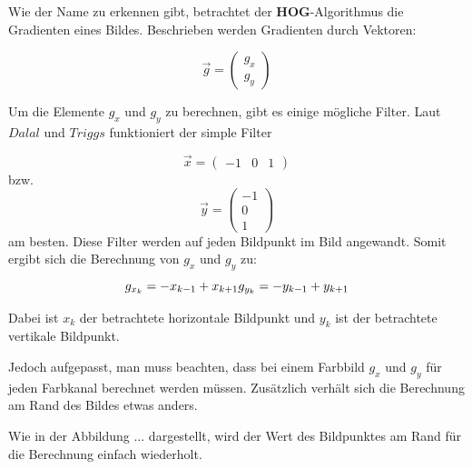 Wie der Name zu erkennen gibt, betrachtet der \textbf{HOG}-Algorithmus die Gradienten eines Bildes. Beschrieben werden Gradienten durch Vektoren:

$$
\vec{g}=\begin{pmatrix}
	g_x \\
	g_y
\end{pmatrix}
$$

Um die Elemente $g_x$ und $g_y$ zu berechnen, gibt es einige mögliche Filter. Laut $Dalal$ und $Triggs$ \cite[S.5]{dalal:inria-00548512} funktioniert der simple Filter

$$
\vec{x}=\begin{pmatrix}
	-1 & 0 & 1
\end{pmatrix}
$$
bzw.
$$
\vec{y}=\begin{pmatrix}
	-1 \\
	0 \\
	1
\end{pmatrix}
$$
am besten.
Diese Filter werden auf jeden Bildpunkt im Bild angewandt. Somit ergibt sich die Berechnung von $g_x$ und $g_y$ zu:
\begin{equation*}
	g_{x_k}=-x_{k-1}+x_{k+1} \\
	g_{y_k}=-y_{k-1}+y_{k+1}
\end{equation*}

Dabei ist $x_k$ der betrachtete horizontale Bildpunkt und $y_k$ ist der betrachtete vertikale Bildpunkt.

Jedoch aufgepasst, man muss beachten, dass bei einem Farbbild $g_x$ und $g_y$ für jeden Farbkanal berechnet werden müssen. Zusätzlich verhält sich die Berechnung am Rand des Bildes etwas anders.

Wie in der Abbildung ... dargestellt, wird der Wert des Bildpunktes am Rand für die Berechnung einfach wiederholt.

